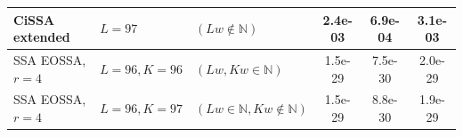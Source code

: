 \documentclass[12pt, specialist, subf
]{disser}
\theoremstyle{definition}
\begin{document}
\begin{table}[H]
\begin{tabular}{l|ll|ccc}
		CiSSA extended     &
		$L = 97  $         & $ (Lw \not \in \mathbb{N})$                   & 2.4e-03 & 6.9e-04                          & 3.1e-03                                                      \\
		\hline
		SSA EOSSA, $r = 4$ &
		$L = 96, K = 96  $ & $ (Lw, Kw \in \mathbb{N})$                    & 1.5e-29 & 7.5e-30                          & 2.0e-29                                                      \\
		SSA EOSSA, $r = 4$ &
		$L = 96, K = 97  $ & $ (Lw \in \mathbb{N}, Kw \not\in \mathbb{N})$ & 1.5e-29 & 8.8e-30                          & 1.9e-29                                                      \\
		\hline
	\end{tabular}
	\label{tab:precise_separability_example1}
\end{table}

\end{document}
